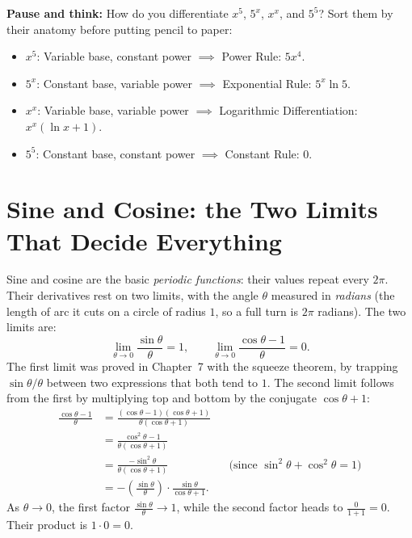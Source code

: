 \begin{recoverybox}
\textbf{Pause and think:} How do you differentiate $x^5$, $5^x$, $x^x$, and $5^5$?
Sort them by their anatomy before putting pencil to paper:
\begin{itemize}
  \item $x^5$: Variable base, constant power $\implies$ Power Rule: $5x^4$.
  \item $5^x$: Constant base, variable power $\implies$ Exponential Rule: $5^x\ln 5$.
  \item $x^x$: Variable base, variable power $\implies$ Logarithmic Differentiation: $x^x(\ln x + 1)$.
  \item $5^5$: Constant base, constant power $\implies$ Constant Rule: $0$.
\end{itemize}
\end{recoverybox}

\section{Sine and Cosine: the Two Limits That Decide Everything}
\label{ch12:trig}

Sine and cosine are the basic \emph{periodic functions}: their
values repeat every $2\pi$. Their derivatives rest on two limits,
with the angle $\theta$ measured in \emph{radians} (the length of arc it cuts
on a circle of radius $1$, so a full turn is $2\pi$ radians). The two limits are:
\[
   \lim_{\theta\to 0}\frac{\sin\theta}{\theta} = 1,
   \qquad
   \lim_{\theta\to 0}\frac{\cos\theta - 1}{\theta} = 0.
\]
The first limit was proved in Chapter~7 with the squeeze
theorem, by trapping $\sin\theta/\theta$ between two expressions that both tend
to $1$. The second limit follows from the first by multiplying top and bottom
by the conjugate $\cos\theta + 1$:
\begin{align*}
   \frac{\cos\theta - 1}{\theta}
   &= \frac{(\cos\theta - 1)(\cos\theta + 1)}{\theta(\cos\theta + 1)} \\
   &= \frac{\cos^2\theta - 1}{\theta(\cos\theta + 1)} \\
   &= \frac{-\sin^2\theta}{\theta(\cos\theta + 1)}
   && \text{(since } \sin^2\theta + \cos^2\theta = 1\text{)} \\
   &= -\left(\frac{\sin\theta}{\theta}\right)\cdot \frac{\sin\theta}{\cos\theta + 1}.
\end{align*}
As $\theta \to 0$, the first factor $\tfrac{\sin\theta}{\theta} \to 1$, while the
second factor heads to $\tfrac{0}{1+1} = 0$. Their product is $1 \cdot 0 = 0$.

